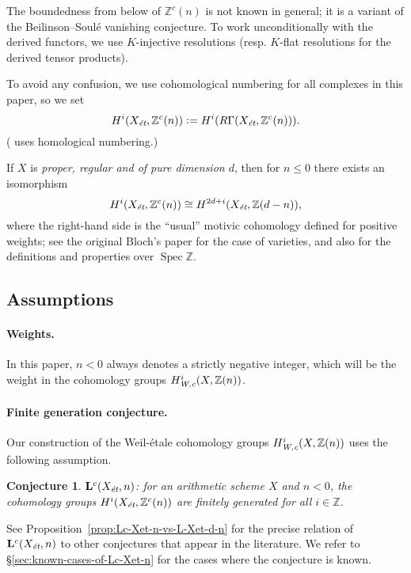 \documentclass[leqno,12pt]{article}
\theoremstyle{plain}
\newtheorem{conjecture}[theorem]{\indent\sc Conjecture}
\theoremstyle{definition}
\DeclareMathOperator{\Spec}{Spec}
\newcommand{\ZZ}{\mathbb{Z}}
\newcommand{\dfn}{\mathrel{\mathop:}=}
\newcommand{\Wc}{\text{\it W,c}}
\newcommand{\et}{\text{\it \'{e}t}}
\begin{document}
The boundedness from below of $\ZZ^c(n)$ is not known in general; it is a
variant of the Beilinson--Soul\'{e} vanishing conjecture. To work
unconditionally with the derived functors, we use $K$-injective resolutions
\cite{Spaltenstein-1988,Serpe-2003} (resp. $K$-flat resolutions for the derived
tensor products).

To avoid any confusion, we use cohomological numbering for all complexes
in this paper, so we set
$$H^i (X_\et, \ZZ^c(n)) \dfn H^i (R\Gamma (X_\et, \ZZ^c(n))).$$
(\cite{Geisser-2010} uses homological numbering.)

If $X$ is \emph{proper, regular and of pure dimension $d$}, then for $n \le 0$
there exists an isomorphism
\begin{equation}
  \label{eqn:Zc(n)-vs-Z(d-n)}
  H^i (X_\et, \ZZ^c(n)) \cong H^{2d+i} (X_\et, \ZZ (d-n)),
\end{equation}
where the right-hand side is the ``usual'' motivic cohomology defined for
positive weights; see the original Bloch's paper \cite{Bloch-1986} for the case
of varieties, and also \cite{Geisser-2004-Dedekind,Geisser-2005} for the
definitions and properties over $\Spec \ZZ$.

\subsection*{Assumptions}

\paragraph{Weights.}
In this paper, $n < 0$ always denotes a strictly negative integer,
which will be the weight in the cohomology groups $H^i_\Wc (X, \ZZ(n))$.

\paragraph{Finite generation conjecture.}
Our construction of the Weil-\'{e}tale cohomology groups $H^i_\Wc (X,\ZZ(n))$
uses the following assumption.

\begin{conjecture}
  $\mathbf{L}^c (X_\et,n)$: for an arithmetic scheme $X$ and $n < 0$,
  the cohomology groups $H^i (X_\et, \ZZ^c (n))$ are finitely generated for all
  $i \in \ZZ$.
\end{conjecture}

See Proposition~\ref{prop:Lc-Xet-n-vs-L-Xet-d-n} for the precise relation of
$\mathbf{L}^c (X_\et,n)$ to other conjectures that appear in the literature.
We refer to \S\ref{sec:known-cases-of-Lc-Xet-n} for the cases where the
conjecture is known.
\end{document}
